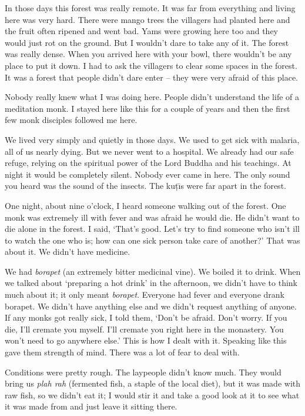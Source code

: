 In those days this forest was really remote. It was far from everything and living here was very hard. There were mango trees the villagers had planted here and the fruit often ripened and went bad. Yams were growing here too and they would just rot on the ground. But I wouldn't dare to take any of it. The forest was really dense. When you arrived here with your bowl, there wouldn't be any place to put it down. I had to ask the villagers to clear some spaces in the forest. It was a forest that people didn't dare enter -- they were very afraid of this place. 

Nobody really knew what I was doing here. People didn't understand the life of a meditation monk. I stayed here like this for a couple of years and then the first few monk disciples followed me here. 

We lived very simply and quietly in those days. We used to get sick with malaria, all of us nearly dying. But we never went to a hospital. We already had our safe refuge, relying on the spiritual power of the Lord Buddha and his teachings. At night it would be completely silent. Nobody ever came in here. The only sound you heard was the sound of the insects. The ku\d{t}\={\i}s were far apart in the forest. 

One night, about nine o'clock, I heard someone walking out of the forest. One monk was extremely ill with fever and was afraid he would die. He didn't want to die alone in the forest. I said, `That's good. Let's try to find someone who isn't ill to watch the one who is; how can one sick person take care of another?' That was about it. We didn't have medicine. 

We had \textit{borapet} (an extremely bitter medicinal vine). We boiled it to drink. When we talked about `preparing a hot drink' in the afternoon, we didn't have to think much about it; it only meant \textit{borapet}. Everyone had fever and everyone drank borapet. We didn't have anything else and we didn't request anything of anyone. If any monks got really sick, I told them, `Don't be afraid. Don't worry. If you die, I'll cremate you myself. I'll cremate you right here in the monastery. You won't need to go anywhere else.' This is how I dealt with it. Speaking like this gave them strength of mind. There was a lot of fear to deal with. 

Conditions were pretty rough. The laypeople didn't know much. They would bring us \textit{plah rah} (fermented fish, a staple of the local diet), but it was made with raw fish, so we didn't eat it; I would stir it and take a good look at it to see what it was made from and just leave it sitting there. 

